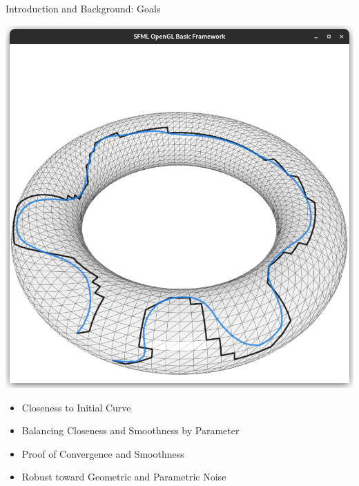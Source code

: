 \documentclass[aspectratio=169,fleqn]{beamer}
\begin{document}
  \begin{frame}{Introduction and Background: Goals}
    \begin{minipage}[c]{0.45\linewidth}
      \includegraphics[width=\linewidth,trim={15px 20 15 50},clip]{images/torus-smooth-0.95.png}
    \end{minipage}
    \hfill
    \begin{minipage}[c]{0.45\linewidth}
      \pause
      \begin{itemize}
        \item<+-> Closeness to Initial Curve
        \item<+-> Balancing Closeness and Smoothness by Parameter
        \item<+-> Proof of Convergence and Smoothness
        \item<+-> Robust toward Geometric and Parametric Noise
      \end{itemize}
    \end{minipage}
  \end{frame}
\end{document}
